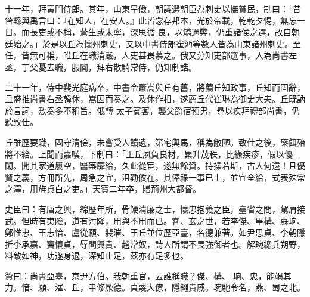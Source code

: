 \begin{pinyinscope}
 十一年，拜黃門侍郎。其年，山東旱儉，朝議選朝臣為刺史以撫貧民，制曰：「昔咎繇與禹言曰：『在知人，在安人。』此皆念存邦本，光於帝載，乾乾夕惕，無忘一日。而長吏或不稱，蒼生或未寧，深思循
 良，以矯過弊，仍重諸侯之選，故自朝廷始之。」於是以丘為懷州刺史，又以中書侍郎崔沔等數人皆為山東諸州刺史。至任，皆無可稱，唯丘在職清嚴，人吏甚畏慕之。俄又分知吏部選事，入為尚書左丞，丁父憂去職，服闋，拜右散騎常侍，仍知制誥。



 二十一年，侍中裴光庭病卒，中書令蕭嵩與丘有舊，將薦丘知政事，丘知而固辭，且盛推尚書右丞韓休，嵩因而奏之。及休作相，遂薦丘代崔琳為御史大夫。丘既訥於言詞，敷奏多不稱旨。俄轉
 太子賓客，襲父爵宿預男，尋以疾拜禮部尚書，仍聽致仕。



 丘雖歷要職，固守清儉，未嘗受人饋遺，第宅輿馬，稱為敝陋。致仕之後，藥餌殆將不給。上聞而嘉嘆，下制曰：「王丘夙負良材，累升茂秩，比緣疾疹，假以優閑。聞其家道屢空，醫藥靡給，久此從宦，遂無餘資。持操若斯，古人何遠！且優賢之義，方冊所先，周急之宜，沮勸攸在。其俸祿一事已上，並宜全給，式表殊常之澤，用旌貞白之吏。」天寶二年卒，贈荊州大都督。



 史臣曰：有唐之興，綿歷年所，骨鯁清廉之士，懷忠抱義之臣，臺省之間，駕肩接武。但時有夷險，道有污隆，用與不用而已。睿、玄之世，若李傑、畢構、蘇珦、鄭惟忠、王志愔、盧從願、裴漼、王丘並位歷亞臺，名德兼著。如尹思貞、李朝隱折李承嘉、竇懷貞，辱閭興貴、趙常奴，詩人所謂不畏強御者也。解琬總兵朔野，料敵如神，功遂身退，深知止足，茲亦有足多也。



 贊曰：尚書亞臺，京尹方伯。我朝重官，云誰稱職？傑、構、
 珦、忠，能竭其力。愔、願、漼、丘，聿修厥德。貞蔑大僚，隱繩貴戚。琬馳令名，燕、蜀之北。



\end{pinyinscope}